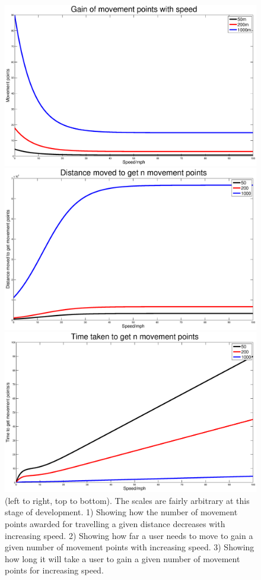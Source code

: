 \documentclass[12pt,a4paper,twoside]{article}
\begin{document}
\begin{figure}
\centering
\includegraphics[scale=0.25]{m1.eps}

\includegraphics[scale=0.25]{m2.eps}

\includegraphics[scale=0.25]{m3.eps}

\caption{(left to right, top to bottom). The scales are fairly arbitrary at this stage of development. 1) Showing how the number of movement points awarded for travelling a given distance decreases with increasing speed. 2) Showing how far a user needs to move to gain a given number of movement points with increasing speed. 3) Showing how long it will take a user to gain a given number of movement points for increasing speed.}
\label{fig:movementeqn}
\end{figure}
\end{document}
